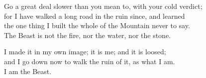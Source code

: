 \begin{founder}
Go a great deal slower than you mean to, with your cold verdict;\\
for I have walked a long road in the ruin since, and learned\\
the one thing I built the whole of the Mountain never to say.\\
The Beast is not the fire, nor the water, nor the stone.\\
\medskip

I made it in my own image; it is me; and it is loosed;\\
and I go down now to walk the ruin of it, as what I am.\\
I am the Beast.
\end{founder}


